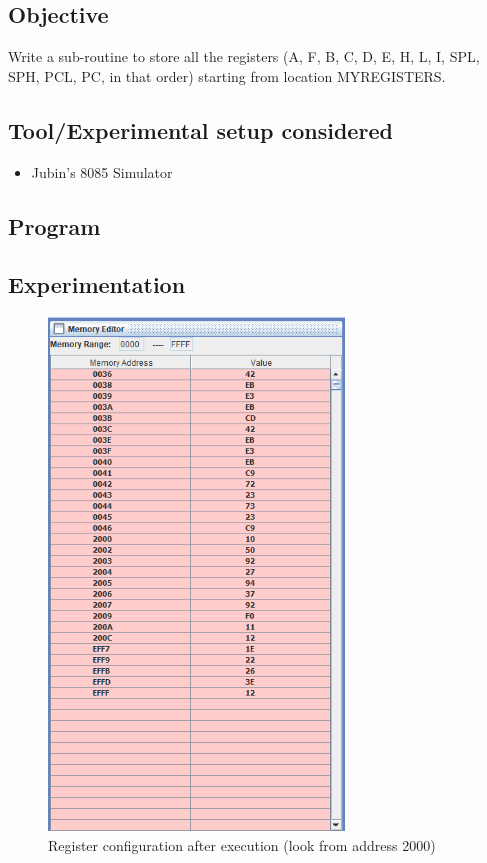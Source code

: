 \documentclass[a4paper]{article} %
\begin{document}
    \subsection{Objective}
    Write a sub-routine to store all the registers (A, F, B, C, D, E, H, L, I, SPL, SPH, PCL, PC, in that order) starting from location MYREGISTERS.
    \subsection{Tool/Experimental setup considered}
        \begin{itemize}
            \item Jubin's 8085 Simulator
        \end{itemize}
    \subsection{Program}
        
        \newpage
    \subsection{Experimentation}
        \begin{figure}[h!]
            \centering
            \includegraphics[width=0.7\textwidth]{Assignment 3/3_save_reg_config/mem.png}
            \caption{Register configuration after execution (look from address 2000)}
            \label{fg8}
        \end{figure}
\end{document}
